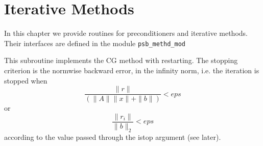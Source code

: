 \section{Iterative Methods}
\label{sec:methods}

In this chapter we provide routines for preconditioners and iterative
methods. Their
interfaces are defined in the module \verb|psb_methd_mod|


%
%


This subroutine implements the CG method with restarting. The
stopping criterion is the normwise backward error, in the infinity
norm, i.e. the iteration is stopped when 
\[ \frac{\|r\|}{(\|A\|\|x\|+\|b\|)} < eps \]
or
\[ \frac{\|r_i\|}{\|b\|_2} < eps \]
according to the value passed through the  istop argument (see later).



